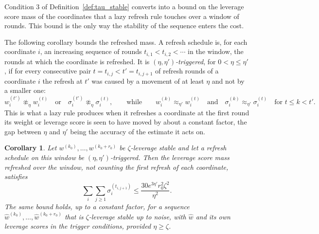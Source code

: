 \documentclass[11pt]{article}
\newtheorem{corollary}[lemma]{Corollary}
\newcommand{\what}{\widehat{w}}
\begin{document}
Condition 3 of Definition~\ref{def:tau_stable} converts into a bound on the
leverage score mass of the coordinates that a lazy refresh rule touches over a
window of rounds.
This bound is the only way the stability of the sequence enters the cost.

The following corollary bounds the refreshed mass.
A refresh schedule is, for each coordinate $i$, an increasing sequence of rounds
$t_{i, 1} < t_{i, 2} < \cdots$ in the window, the rounds at which the coordinate
is refreshed.
It is \emph{$(\eta, \eta')$-triggered}, for
$0 < \eta \le \eta'$, if for every consecutive pair
$t = t_{i, j} < t' = t_{i, j + 1}$ of refresh rounds of a coordinate
$i$ the refresh at
$t'$ was caused by a movement of at least
$\eta$ and not by a smaller one:
\[
w^{(t')}_i \not\approx_{\eta} w^{(t)}_i
\quad\text{or}\quad
\sigma^{(t')}_i \not\approx_{\eta} \sigma^{(t)}_i ,
\qquad\text{while}\qquad
w^{(k)}_i \approx_{\eta'} w^{(t)}_i
\quad\text{and}\quad
\sigma^{(k)}_i \approx_{\eta'} \sigma^{(t)}_i
\quad\text{for } t \le k < t' .
\]
This is what a lazy rule produces when it refreshes a coordinate at the first
round its weight or leverage score is seen to have moved by about a constant
factor, the gap between $\eta$ and
$\eta'$ being the accuracy of the estimate it acts on.

\begin{corollary}
\label{cor:update_counts}
Let $w^{(k_0)}, \ldots, w^{(k_0 + r_0)}$ be
$\zeta$-leverage stable and let a refresh schedule on this window be
$(\eta, \eta')$-triggered.
Then the leverage score mass refreshed over the window, not counting the first
refresh of each coordinate, satisfies
\[
\sum_i \sum_{j \ge 1} \sigma^{(t_{i, j + 1})}_i
\le
\frac{30 e^{3 \eta'} r_0^{2} \zeta^{2}}{\eta^{2}} .
\]
The same bound holds, up to a constant factor, for a sequence
$\what^{(k_0)}, \ldots, \what^{(k_0 + r_0)}$ that is
$\zeta$-leverage stable up to noise, with
$\what$ and its own leverage scores in the trigger conditions, provided
$\eta \ge \zeta$.
\end{corollary}
\end{document}
